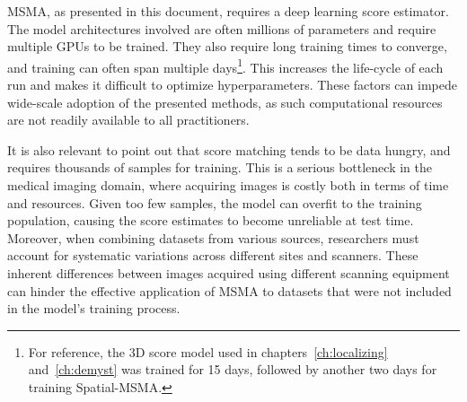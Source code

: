 MSMA, as presented in this document, requires a deep learning score estimator. The model architectures involved are often millions of parameters and require multiple GPUs to be trained. They also require long training times to converge, and training can often span multiple days\footnote{For reference, the 3D score model used in chapters~\ref{ch:localizing} and~\ref{ch:demyst} was trained for 15 days, followed by another two days for training Spatial-MSMA. }. This increases the life-cycle of each run and makes it difficult to optimize hyperparameters. These factors can impede wide-scale adoption of the presented methods, as such computational resources are not readily available to all practitioners. 

It is also relevant to point out that score matching tends to be data hungry, and requires thousands of samples for training. This is a serious bottleneck in the medical imaging domain, where acquiring images is costly both in terms of time and resources. Given too few samples, the model can overfit to the training population, causing the score estimates to become unreliable at test time.
Moreover, when combining datasets from various sources, researchers must account for systematic variations across different sites and scanners. These inherent differences between images acquired using different scanning equipment can hinder the effective application of MSMA to datasets that were not included in the model's training process.








